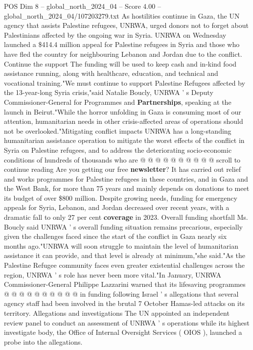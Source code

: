 \begin{textsample}{POS Dim 8 – global\_north\_2024\_04 – Score 4.00 – global\_north\_2024\_04/107203279.txt}  \label{ex:f8_pos_316}
As hostilities continue in Gaza, the UN agency that assists Palestine refugees, UNRWA, urged donors not to forget about Palestinians affected by the ongoing war in Syria.
UNRWA on Wednesday launched a \$414.4 million appeal for Palestine refugees in Syria and those who have fled the country for neighbouring Lebanon and Jordan due to the conflict.
Continue the support The funding will be used to keep cash and in-kind food assistance running, along with healthcare, education, and technical and vocational training."We must continue to support Palestine Refugees affected by the 13-year-long Syria crisis,"said Natalie Boucly, UNRWA ' s Deputy Commissioner-General for Programmes and \textbf{Partnerships}, speaking at the launch in Beirut."While the horror unfolding in Gaza is consuming most of our attention, humanitarian needs in other crisis-affected areas of operations should not be overlooked."Mitigating conflict impacts UNRWA has a long-standing humanitarian assistance operation to mitigate the worst effects of the conflict in Syria on Palestine refugees, and to address the deteriorating socio-economic conditions of hundreds of thousands who are @ @ @ @ @ @ @ @ @ @ scroll to continue reading Are you getting our free \textbf{newsletter}?
It has carried out relief and works programmes for Palestine refugees in these countries, and in Gaza and the West Bank, for more than 75 years and mainly depends on donations to meet its budget of over \$800 million.
Despite growing needs, funding for emergency appeals for Syria, Lebanon, and Jordan decreased over recent years, with a dramatic fall to only 27 per cent \textbf{coverage} in 2023.
Overall funding shortfall Ms.
Boucly said UNRWA ' s overall funding situation remains precarious, especially given the challenges faced since the start of the conflict in Gaza nearly six months ago."UNRWA will soon struggle to maintain the level of humanitarian assistance it can provide, and that level is already at minimum,"she said."As the Palestine Refugee community faces even greater existential challenges across the region, UNRWA ' s role has never been more vital."In January, UNRWA Commissioner-General Philippe Lazzarini warned that its lifesaving programmes @ @ @ @ @ @ @ @ @ @ in funding following Israel ' s allegations that several agency staff had been involved in the brutal 7 October Hamas-led attacks on its territory.
Allegations and investigations The UN appointed an independent review panel to conduct an assessment of UNRWA ' s operations while its highest investigate body, the Office of Internal Oversight Services ( OIOS ), launched a probe into the allegations.

\end{textsample}
